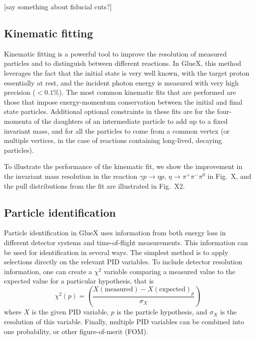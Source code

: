[say something about fiducial cuts?]

\subsection{Kinematic fitting \label{sec:perffitting}}

Kinematic fitting is a powerful tool to improve the resolution of measured particles and to distinguish between different reactions.  In GlueX, this method leverages the fact that the initial state is very well known, with the target proton essentially at rest, and the incident photon energy is measured with very high precision ($<0.1\%$).  The most common kinematic fits that are performed are those that impose energy-momentum conservation between the initial and final state particles.  Additional optional constraints in these fits are for the four-momenta of the daughters of an intermediate particle to add up to a fixed invariant mass, and for all the particles to come from a common vertex (or multiple vertices, in the case of reactions containing long-lived, decaying particles).

To illustrate the performance of the kinematic fit, we show the improvement in the invariant mass resolution in the reaction $\gamma p \to \eta p$, $\eta \to \pi^+\pi^-\pi^0$ in Fig.~X, and the pull distributions from the fit are illustrated in Fig.~X2.

\subsection{Particle identification \label{sec:perfpid}}

Particle identification in GlueX uses information from both energy loss in different detector systems and time-of-flight measurements.  This information can be used for identification in several ways.  The simplest method is to apply selections directly on the relevant PID variables.  To include detector resolution information, one can create a $\chi^2$ variable comparing a measured value to the expected value for a particular hypothesis, that is
\begin{equation}
    \chi^2(p) = \left(  \frac{ X(\mathrm{measured}) - X(\mathrm{expected})_p}{\sigma_X} \right)
\end{equation}
where $X$ is the given PID variable, $p$ is the particle hypothesis, and $\sigma_X$ is the resolution of this variable.  Finally, multiple PID variables can be combined into one probability, or other figure-of-merit (FOM).

